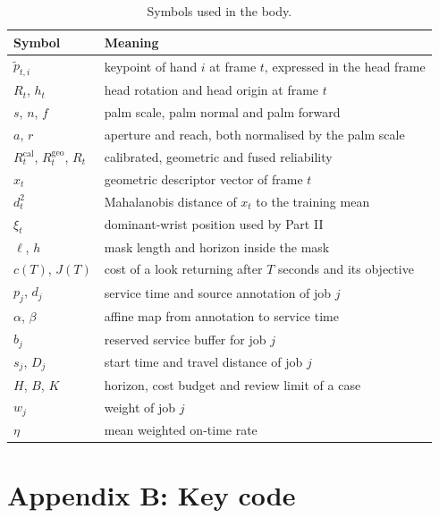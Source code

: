 \documentclass{swmcmthesis}
\begin{document}
\begin{table}[htbp]
\centering
\caption{Symbols used in the body.}
\small
\begin{tabular}{ll}
\toprule
Symbol & Meaning \\
\midrule
$\tilde p_{t,i}$ & keypoint of hand $i$ at frame $t$, expressed in the head frame \\
$R_t$, $h_t$ & head rotation and head origin at frame $t$ \\
$s$, $n$, $f$ & palm scale, palm normal and palm forward \\
$a$, $r$ & aperture and reach, both normalised by the palm scale \\
$R^{\text{cal}}_t$, $R^{\text{geo}}_t$, $R_t$ & calibrated, geometric and fused reliability \\
$x_t$ & geometric descriptor vector of frame $t$ \\
$d_t^{2}$ & Mahalanobis distance of $x_t$ to the training mean \\
$\xi_t$ & dominant-wrist position used by Part II \\
$\ell$, $h$ & mask length and horizon inside the mask \\
$c(T)$, $J(T)$ & cost of a look returning after $T$ seconds and its objective \\
$p_j$, $d_j$ & service time and source annotation of job $j$ \\
$\alpha$, $\beta$ & affine map from annotation to service time \\
$b_j$ & reserved service buffer for job $j$ \\
$s_j$, $D_j$ & start time and travel distance of job $j$ \\
$H$, $B$, $K$ & horizon, cost budget and review limit of a case \\
$w_j$ & weight of job $j$ \\
$\eta$ & mean weighted on-time rate \\
\bottomrule
\end{tabular}
\end{table}

\section*{Appendix B: Key code}
\label{app:code}
\end{document}
